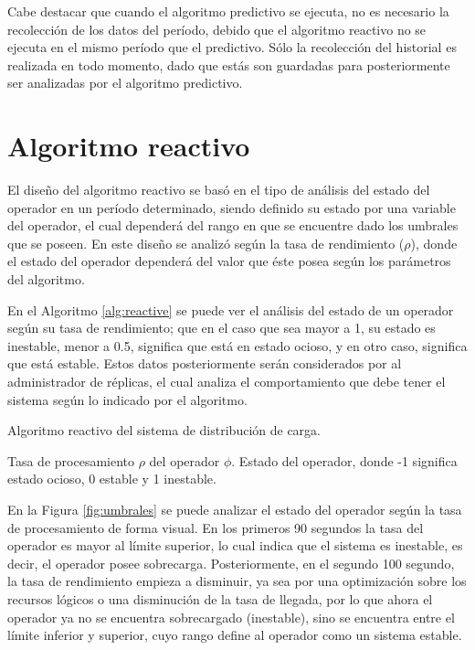 Cabe destacar que cuando el algoritmo predictivo se ejecuta, no es necesario la recolección de los datos del período, debido que el algoritmo reactivo no se ejecuta en el mismo período que el predictivo. Sólo la recolección del historial es realizada en todo momento, dado que estás son guardadas para posteriormente ser analizadas por el algoritmo predictivo.

\section{Algoritmo reactivo}
El diseño del algoritmo reactivo se basó en el tipo de análisis del estado del operador en un período determinado, siendo definido su estado por una variable del operador, el cual dependerá del rango en que se encuentre dado los umbrales que se poseen. En este diseño se analizó según la tasa de rendimiento ($\rho$), donde el estado del operador dependerá del valor que éste posea según los parámetros del algoritmo.

En el Algoritmo \ref{alg:reactive} se puede ver el análisis del estado de un operador según su tasa de rendimiento; que en el caso que sea mayor a 1, su estado es inestable, menor a 0.5, significa que está en estado ocioso, y en otro caso, significa que está estable. Estos datos posteriormente serán considerados por al administrador de réplicas, el cual analiza el comportamiento que debe tener el sistema según lo indicado por el algoritmo.

\begin{algorithm}[!ht]
	\caption{Algoritmo reactivo del sistema de distribución de carga.}
	\label{alg:reactive}
	\begin{algorithmic}[1]
	\REQUIRE Tasa de procesamiento $\rho$ del operador $\phi$.
	\ENSURE Estado del operador, donde -1 significa estado ocioso, 0 estable y 1 inestable.
	\ELSE
	\ENDIF
	\end{algorithmic}
\end{algorithm}

En la Figura \ref{fig:umbrales} se puede analizar el estado del operador según la tasa de procesamiento de forma visual. En los primeros 90 segundos la tasa del operador es mayor al límite superior, lo cual indica que el sistema es inestable, es decir, el operador posee sobrecarga. Posteriormente, en el segundo 100 segundo, la tasa de rendimiento empieza a disminuir, ya sea por una optimización sobre los recursos lógicos o una disminución de la tasa de llegada, por lo que ahora el operador ya no se encuentra sobrecargado (inestable), sino se encuentra entre el límite inferior y superior, cuyo rango define al operador como un sistema estable.

